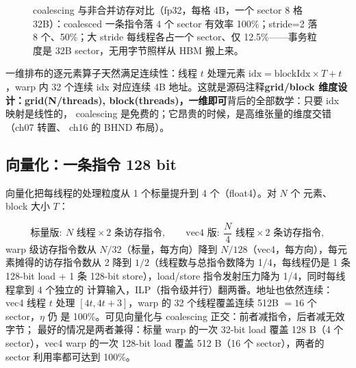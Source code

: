 \begin{figure}[htbp]
{}
\caption{coalescing 与非合并访存对比（fp32，每格 4B，一个 sector 8 格 32B）：coalesced 一条指令落 4 个 sector 有效率 100\%；stride=2 落 8 个、50\%；大 stride 每线程各占一个 sector、仅 12.5\%——事务粒度是 32B sector，无用字节照样从 HBM 搬上来。}
\label{fig:3-1}
\end{figure}

一维排布的逐元素算子天然满足连续性：线程 $t$ 处理元素
$\mathrm{idx} = \mathrm{blockIdx} \times T + t$，warp 内 32 个连续 idx
对应连续 4B 地址。这就是源码注释\textbf{grid/block 维度设计：grid(N/threads),
block(threads)，一维即可}背后的全部数学：只要 idx 映射是线性的，
coalescing 是免费的；它昂贵的时候，是高维张量的维度交错（ch07 转置、
ch16 的 BHND 布局）。

\subsection{向量化：一条指令 128 bit}

向量化把每线程的处理粒度从 1 个标量提升到 4 个（float4）。对 $N$ 个
元素、block 大小 $T$：

\begin{equation}
  \text{标量版}:\ N \text{ 线程} \times 2 \text{ 条访存指令},
  \qquad
  \text{vec4 版}:\ \frac{N}{4} \text{ 线程} \times 2 \text{ 条访存指令},
\end{equation}
warp 级访存指令数从 $N/32$（标量，每方向）降到 $N/128$（vec4，每方向），每元素摊得的访存指令数从 2 降到
$1/2$（线程数与总指令数降为 1/4，每线程仍是 1 条 128-bit load + 1 条
128-bit store），load/store 指令发射压力降为 1/4，同时每线程拿到 4 个独立的
计算输入，ILP（指令级并行）翻两番。地址也依然连续：vec4 线程 $t$ 处理
$[4t, 4t+3]$，warp 的 32 个线程覆盖连续 512B $= 16$ 个 sector，$\eta$ 仍
是 100\%。可见向量化与 coalescing 正交：前者减指令，后者减无效字节；
最好的情况是两者兼得：标量 warp 的一次 32-bit load 覆盖 128 B（4 个 sector），vec4 warp 的一次 128-bit load 覆盖 512 B（16 个 sector），两者的 sector 利用率都可达到 100\%。

